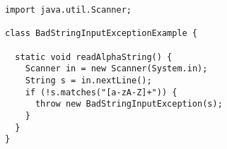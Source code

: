 \begin{lstlisting}[language=MyJava]
import java.util.Scanner;

class BadStringInputExceptionExample {
  
  static void readAlphaString() {
    Scanner in = new Scanner(System.in);
    String s = in.nextLine();
    if (!s.matches("[a-zA-Z]+")) { 
      throw new BadStringInputException(s); 
    }
  }
}
\end{lstlisting}
